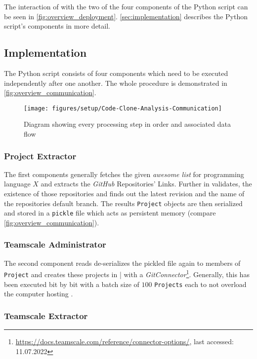 The interaction of \teamscale{} with the two of the four components of the Python script\gitFootnote{} can be seen in \autoref{fig:overview_deployment}. \autoref{sec:implementation} describes the Python script's components in more detail.

\subsection{Implementation}
\label{sec:implementation}

The Python script consists of four components which need to be executed independently after one another. The whole procedure is demonstrated in \autoref{fig:overview_communication}.

\begin{figure}[tbh]
	\centering
	\texttt{[image: figures/setup/Code-Clone-Analysis-Communication]}
	\caption{Diagram showing every processing step in order and associated data flow}
	\label{fig:overview_communication}
\end{figure}

\subsubsection{Project Extractor}

The first components generally fetches the given \textit{awesome list} for programming language $X$ and extracts the \textit{GitHub} Repositories' Links. Further in validates, the existence of those repositories and finds out the latest revision and the name of the repositories default branch. The results \texttt{Project} objects are then serialized and stored in a \texttt{pickle} file which acts as persistent memory (compare \autoref{fig:overview_communication}).

\subsubsection{Teamscale Administrator}

The second component reads de-serializes the pickled file again to members of \texttt{Project} and creates these projects in \teamscale|{} with a \textit{GitConnector}\footnote{\url{https://docs.teamscale.com/reference/connector-options/}, last accessed: 11.07.2022}. Generally, this has been executed bit by bit with a batch size of $100$ \texttt{Projects} each to not overload the computer hosting \teamscale{}.

\subsubsection{Teamscale Extractor}

